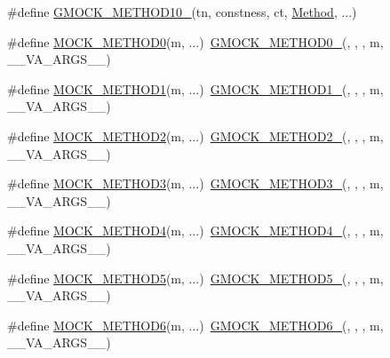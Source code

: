 \begin{DoxyCompactItemize}
\item 
\#define \hyperlink{gmock-generated-function-mockers_8h_a81a48223a8771de36ef92ac6d56f6e81}{G\+M\+O\+C\+K\+\_\+\+M\+E\+T\+H\+O\+D10\+\_\+}(tn,  constness,  ct,  \hyperlink{gmock-spec-builders__test_8cc_a95606368148f3e5aab5db46c32466afd}{Method}, ...)
\item 
\#define \hyperlink{gmock-generated-function-mockers_8h_a411c69e9d489d590480f728d365ae450}{M\+O\+C\+K\+\_\+\+M\+E\+T\+H\+O\+D0}(m, ...)~\hyperlink{gmock-generated-function-mockers_8h_ae0d290ffa58d7c624b2e3487ba1252f4}{G\+M\+O\+C\+K\+\_\+\+M\+E\+T\+H\+O\+D0\+\_\+}(, , , m, \+\_\+\+\_\+\+V\+A\+\_\+\+A\+R\+G\+S\+\_\+\+\_\+)
\item 
\#define \hyperlink{gmock-generated-function-mockers_8h_ac49d366be035ee87b73264a29059cdc7}{M\+O\+C\+K\+\_\+\+M\+E\+T\+H\+O\+D1}(m, ...)~\hyperlink{gmock-generated-function-mockers_8h_a1bc0012d62440dda77208dabdf4925c9}{G\+M\+O\+C\+K\+\_\+\+M\+E\+T\+H\+O\+D1\+\_\+}(, , , m, \+\_\+\+\_\+\+V\+A\+\_\+\+A\+R\+G\+S\+\_\+\+\_\+)
\item 
\#define \hyperlink{gmock-generated-function-mockers_8h_ab3fb7d97f21dc99205db38a14df4a1c4}{M\+O\+C\+K\+\_\+\+M\+E\+T\+H\+O\+D2}(m, ...)~\hyperlink{gmock-generated-function-mockers_8h_a885295ca6bebb15efb3fc786218c5d47}{G\+M\+O\+C\+K\+\_\+\+M\+E\+T\+H\+O\+D2\+\_\+}(, , , m, \+\_\+\+\_\+\+V\+A\+\_\+\+A\+R\+G\+S\+\_\+\+\_\+)
\item 
\#define \hyperlink{gmock-generated-function-mockers_8h_af11ebf7fafb231778846dba77725cfdd}{M\+O\+C\+K\+\_\+\+M\+E\+T\+H\+O\+D3}(m, ...)~\hyperlink{gmock-generated-function-mockers_8h_af7c77ba511c631de02bb8c45a6ed3045}{G\+M\+O\+C\+K\+\_\+\+M\+E\+T\+H\+O\+D3\+\_\+}(, , , m, \+\_\+\+\_\+\+V\+A\+\_\+\+A\+R\+G\+S\+\_\+\+\_\+)
\item 
\#define \hyperlink{gmock-generated-function-mockers_8h_a111d70ee62b09089ec3cd7d6662e5cd2}{M\+O\+C\+K\+\_\+\+M\+E\+T\+H\+O\+D4}(m, ...)~\hyperlink{gmock-generated-function-mockers_8h_ab6430f2cfad9de4aca5258ea559294bb}{G\+M\+O\+C\+K\+\_\+\+M\+E\+T\+H\+O\+D4\+\_\+}(, , , m, \+\_\+\+\_\+\+V\+A\+\_\+\+A\+R\+G\+S\+\_\+\+\_\+)
\item 
\#define \hyperlink{gmock-generated-function-mockers_8h_a9b83bed95e89664e61d3a36174de0052}{M\+O\+C\+K\+\_\+\+M\+E\+T\+H\+O\+D5}(m, ...)~\hyperlink{gmock-generated-function-mockers_8h_a9e3ecd392499ab19a4a6d3adcabf56f6}{G\+M\+O\+C\+K\+\_\+\+M\+E\+T\+H\+O\+D5\+\_\+}(, , , m, \+\_\+\+\_\+\+V\+A\+\_\+\+A\+R\+G\+S\+\_\+\+\_\+)
\item 
\#define \hyperlink{gmock-generated-function-mockers_8h_add8f8f786444c2c85ac67f550dbde5a6}{M\+O\+C\+K\+\_\+\+M\+E\+T\+H\+O\+D6}(m, ...)~\hyperlink{gmock-generated-function-mockers_8h_ad0ca7f6973a076d0af4c953f8ed91842}{G\+M\+O\+C\+K\+\_\+\+M\+E\+T\+H\+O\+D6\+\_\+}(, , , m, \+\_\+\+\_\+\+V\+A\+\_\+\+A\+R\+G\+S\+\_\+\+\_\+)

\end{DoxyCompactItemize}
